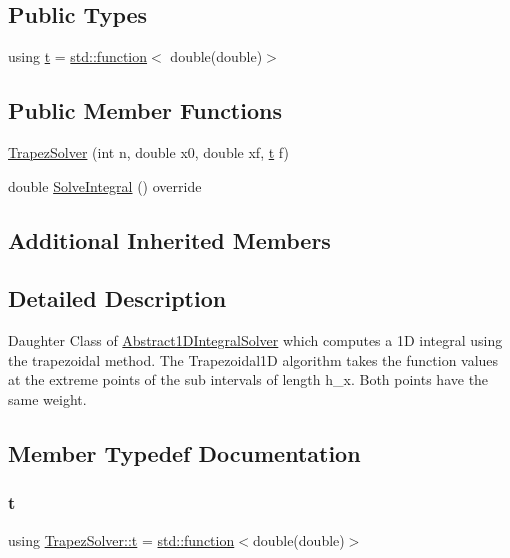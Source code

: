\subsection*{Public Types}
\begin{DoxyCompactItemize}
\item 
using \hyperlink{class_trapez_solver_ac94a3e89df0d6bacc7d62e3784fd4162}{t} = \hyperlink{_tests_8cpp_a1c2dbde1ba7d93e381d4ccb9f603be16}{std\+::function}$<$ double(double)$>$
\end{DoxyCompactItemize}
\subsection*{Public Member Functions}
\begin{DoxyCompactItemize}
\item 
\hyperlink{class_trapez_solver_aacba017d146636c666dff931f6c43323}{Trapez\+Solver} (int n, double x0, double xf, \hyperlink{class_abstract1_d_integral_solver_a7d8e60dfe7eb70e5c19dd71ac0b03880}{t} f)
\item 
double \hyperlink{class_trapez_solver_a15651e2fba081b87b484a83fc424c81d}{Solve\+Integral} () override
\end{DoxyCompactItemize}
\subsection*{Additional Inherited Members}


\subsection{Detailed Description}
Daughter Class of \hyperlink{class_abstract1_d_integral_solver}{Abstract1\+D\+Integral\+Solver} which computes a 1D integral using the trapezoidal method. The Trapezoidal1D algorithm takes the function values at the extreme points of the sub intervals of length h\+\_\+x. Both points have the same weight. 

\subsection{Member Typedef Documentation}
\mbox{\label{class_trapez_solver_ac94a3e89df0d6bacc7d62e3784fd4162}} 
\subsubsection{\texorpdfstring{t}{t}}
{\footnotesize\ttfamily using \hyperlink{class_trapez_solver_ac94a3e89df0d6bacc7d62e3784fd4162}{Trapez\+Solver\+::t} =  \hyperlink{_tests_8cpp_a1c2dbde1ba7d93e381d4ccb9f603be16}{std\+::function}$<$double(double)$>$}

